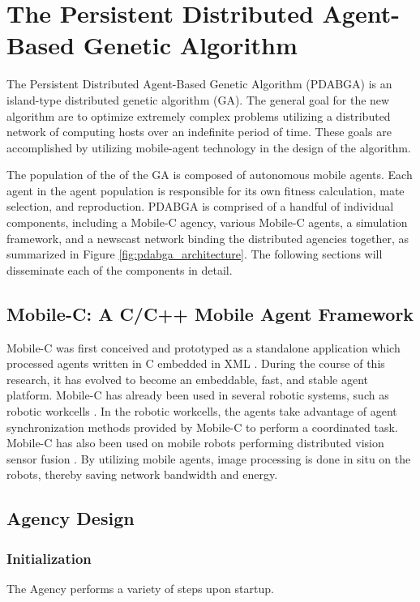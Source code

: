 \chapter{The Persistent Distributed Agent-Based Genetic Algorithm}
  The Persistent Distributed Agent-Based Genetic Algorithm (PDABGA) 
    is an island-type distributed genetic algorithm (GA). 
  The general goal for the new algorithm are to optimize extremely
    complex problems utilizing a distributed network of computing hosts
    over an indefinite period of time.
  These goals are accomplished by utilizing mobile-agent technology in the 
    design of the algorithm.

  The population of the of the GA is composed of autonomous mobile agents.
  Each agent in the agent population is responsible for its own fitness
    calculation, mate selection, and reproduction.
  PDABGA is
    comprised of a handful of individual components, including a Mobile-C
    agency, various Mobile-C agents, a simulation framework, and a
    newscast network binding the distributed agencies together, as summarized
    in Figure \ref{fig:pdabga_architecture}.
  The following sections will disseminate each of the components in detail.

  \section{Mobile-C: A C/C++ Mobile Agent Framework}
    Mobile-C was first conceived and prototyped as a standalone application which
      processed agents written in C embedded in XML \cite{chen2005}. 
    During the course of this research, it has evolved to become an embeddable,
      fast, and stable agent platform. 
    Mobile-C has already been used in several robotic systems, such as robotic
      workcells \cite{Nestinge2010b}. 
    In the robotic workcells, the agents take advantage of agent
      synchronization methods provided by Mobile-C to perform a coordinated task.
    Mobile-C has also been used on mobile robots performing distributed vision
      sensor fusion \cite{Nestinge2010}. 
    By utilizing mobile agents, image processing is done in situ on the robots,
      thereby saving network bandwidth and energy.

  \section{Agency Design}
    \subsection{Initialization}
      The Agency performs a variety of steps upon startup.



